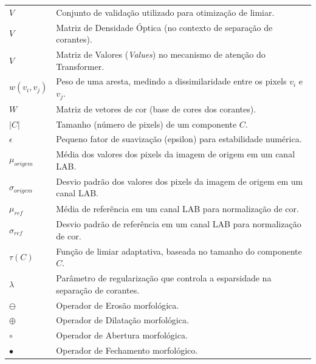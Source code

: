 \begin{longtable}{p{2.5cm} p{12.5cm}}
    $V$       & Conjunto de validação utilizado para otimização de limiar. \\
    $V$       & Matriz de Densidade Óptica (no contexto de separação de corantes). \\
    $V$       & Matriz de Valores (\textit{Values}) no mecanismo de atenção do Transformer. \\
    $w(v_i, v_j)$ & Peso de uma aresta, medindo a dissimilaridade entre os pixels $v_i$ e $v_j$. \\
    $W$       & Matriz de vetores de cor (base de cores dos corantes). \\
    $|C|$     & Tamanho (número de pixels) de um componente $C$. \\
    $\epsilon$ & Pequeno fator de suavização (epsilon) para estabilidade numérica. \\
    $\mu_{origem}$ & Média dos valores dos pixels da imagem de origem em um canal LAB. \\
    $\sigma_{origem}$ & Desvio padrão dos valores dos pixels da imagem de origem em um canal LAB. \\
    $\mu_{ref}$ & Média de referência em um canal LAB para normalização de cor. \\
    $\sigma_{ref}$ & Desvio padrão de referência em um canal LAB para normalização de cor. \\
    $\tau(C)$ & Função de limiar adaptativa, baseada no tamanho do componente $C$. \\
    $\lambda$ & Parâmetro de regularização que controla a esparsidade na separação de corantes. \\
    $\ominus$  & Operador de Erosão morfológica. \\
    $\oplus$  & Operador de Dilatação morfológica. \\
    $\circ$   & Operador de Abertura morfológica. \\
    $\bullet$ & Operador de Fechamento morfológico. \\

\end{longtable}
